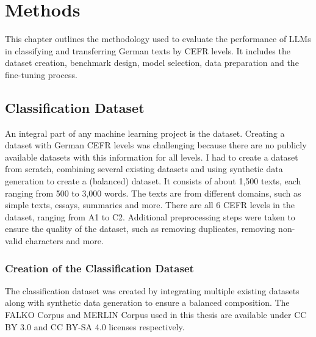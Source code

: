 \chapter{Methods}
\label{ch:methods}
This chapter outlines the methodology used to evaluate the performance of LLMs in classifying and transferring German texts by CEFR levels. It includes the dataset creation, benchmark design, model selection, data preparation and the fine-tuning process.

\section{Classification Dataset}
\label{s:dataset}
An integral part of any machine learning project is the dataset. Creating a dataset with German CEFR levels was challenging because there are no publicly available datasets with this information for all levels. I had to create a dataset from scratch, combining several existing datasets and using synthetic data generation to create a (balanced) dataset. It consists of about 1,500 texts, each ranging from 500 to 3,000 words. The texts are from different domains, such as simple texts, essays, summaries and more. There are all 6 CEFR levels in the dataset, ranging from A1 to C2. Additional preprocessing steps were taken to ensure the quality of the dataset, such as removing duplicates, removing non-valid characters and more.

\subsection{Creation of the Classification Dataset}
\label{ss:dataset_creation}
The classification dataset was created by integrating multiple existing datasets along with synthetic data generation to ensure a balanced composition. The FALKO Corpus \citep{reznicek2010falko} and MERLIN Corpus \citep{boyd2014merlin} used in this thesis are available under CC BY 3.0 and CC BY-SA 4.0 licenses respectively.
